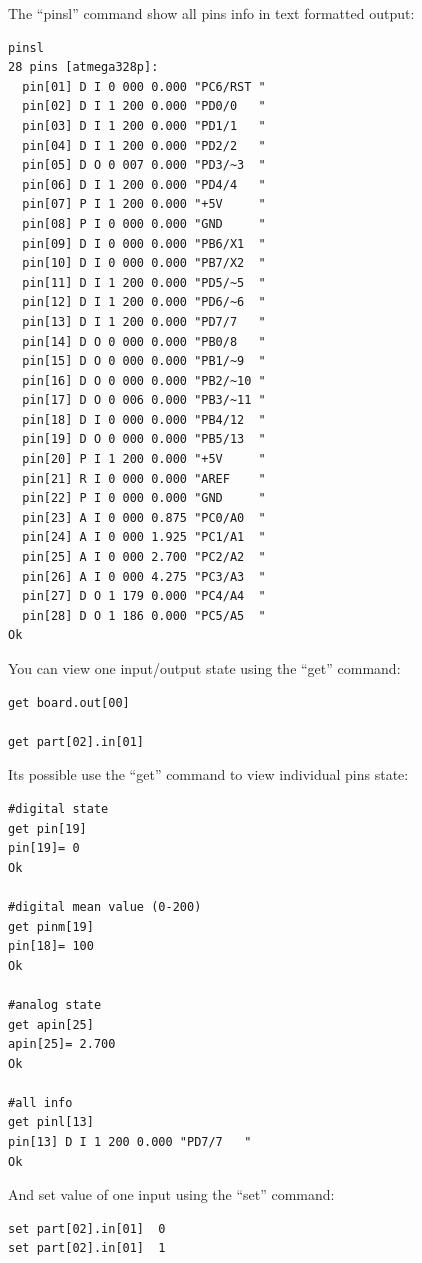 The ``pinsl'' command show all pins info in text formatted output:
\begin{verbatim}
pinsl
28 pins [atmega328p]:
  pin[01] D I 0 000 0.000 "PC6/RST " 
  pin[02] D I 1 200 0.000 "PD0/0   " 
  pin[03] D I 1 200 0.000 "PD1/1   " 
  pin[04] D I 1 200 0.000 "PD2/2   " 
  pin[05] D O 0 007 0.000 "PD3/~3  " 
  pin[06] D I 1 200 0.000 "PD4/4   " 
  pin[07] P I 1 200 0.000 "+5V     " 
  pin[08] P I 0 000 0.000 "GND     " 
  pin[09] D I 0 000 0.000 "PB6/X1  " 
  pin[10] D I 0 000 0.000 "PB7/X2  " 
  pin[11] D I 1 200 0.000 "PD5/~5  " 
  pin[12] D I 1 200 0.000 "PD6/~6  " 
  pin[13] D I 1 200 0.000 "PD7/7   " 
  pin[14] D O 0 000 0.000 "PB0/8   " 
  pin[15] D O 0 000 0.000 "PB1/~9  " 
  pin[16] D O 0 000 0.000 "PB2/~10 " 
  pin[17] D O 0 006 0.000 "PB3/~11 " 
  pin[18] D I 0 000 0.000 "PB4/12  " 
  pin[19] D O 0 000 0.000 "PB5/13  " 
  pin[20] P I 1 200 0.000 "+5V     " 
  pin[21] R I 0 000 0.000 "AREF    " 
  pin[22] P I 0 000 0.000 "GND     " 
  pin[23] A I 0 000 0.875 "PC0/A0  " 
  pin[24] A I 0 000 1.925 "PC1/A1  " 
  pin[25] A I 0 000 2.700 "PC2/A2  " 
  pin[26] A I 0 000 4.275 "PC3/A3  " 
  pin[27] D O 1 179 0.000 "PC4/A4  " 
  pin[28] D O 1 186 0.000 "PC5/A5  " 
Ok
\end{verbatim}


You can view one input/output state using the ``get'' command:
\begin{verbatim}
get board.out[00]

get part[02].in[01]
\end{verbatim}

Its possible use the ``get'' command to view individual pins state:
\begin{verbatim}
#digital state
get pin[19]
pin[19]= 0 
Ok

#digital mean value (0-200)
get pinm[19]
pin[18]= 100 
Ok

#analog state
get apin[25]
apin[25]= 2.700
Ok

#all info
get pinl[13]
pin[13] D I 1 200 0.000 "PD7/7   "
Ok
\end{verbatim}



And set value of one input using the ``set'' command:
\begin{verbatim}
set part[02].in[01]  0
set part[02].in[01]  1
\end{verbatim}

